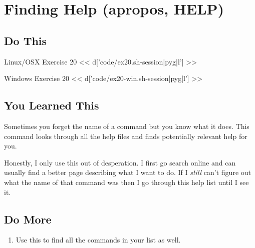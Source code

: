 \chapter{Finding Help (apropos, HELP)}

\section{Do This}

\begin{code}{Linux/OSX Exercise 20}
<< d['code/ex20.sh-session|pyg|l'] >>
\end{code}

\begin{code}{Windows Exercise 20}
<< d['code/ex20-win.sh-session|pyg|l'] >>
\end{code}

\section{You Learned This}

Sometimes you forget the name of a command but you know what it does.  This command
looks through all the help files and finds potentially relevant help for you.

Honestly, I only use this out of desperation.  I first go search online and can
usually find a better page describing what I want to do.  If I \emph{still} can't
figure out what the name of that command was then I go through this help list
until I see it.

\section{Do More}

\begin{enumerate}
\item Use this to find all the commands in your list as well.
\end{enumerate}


